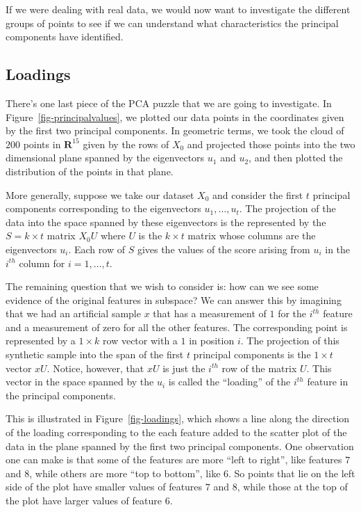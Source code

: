 \documentclass[
  11pt,
  letterpaper,
]{scrbook}
\theoremstyle{plain}
\theoremstyle{plain}
\theoremstyle{remark}
\begin{document}
If we were dealing with real data, we would now want to investigate the
different groups of points to see if we can understand what
characteristics the principal components have identified.

\hypertarget{loadings}{%
\subsection{Loadings}\label{loadings}}

There's one last piece of the PCA puzzle that we are going to
investigate. In Figure~\ref{fig-principalvalues}, we plotted our data
points in the coordinates given by the first two principal components.
In geometric terms, we took the cloud of \(200\) points in
\(\mathbf{R}^{15}\) given by the rows of \(X_{0}\) and projected those
points into the two dimensional plane spanned by the eigenvectors
\(u_{1}\) and \(u_{2}\), and then plotted the distribution of the points
in that plane.

More generally, suppose we take our dataset \(X_{0}\) and consider the
first \(t\) principal components corresponding to the eigenvectors
\(u_{1},\ldots, u_{t}\). The projection of the data into the space
spanned by these eigenvectors is the represented by the
\(S = k\times t\) matrix \(X_{0}U\) where \(U\) is the \(k\times t\)
matrix whose columns are the eigenvectors \(u_{i}\). Each row of \(S\)
gives the values of the score arising from \(u_{i}\) in the \(i^{th}\)
column for \(i=1,\ldots, t\).

The remaining question that we wish to consider is: how can we see some
evidence of the original features in subspace? We can answer this by
imagining that we had an artificial sample \(x\) that has a measurement
of \(1\) for the \(i^{th}\) feature and a measurement of zero for all
the other features. The corresponding point is represented by a
\(1\times k\) row vector with a \(1\) in position \(i\). The projection
of this synthetic sample into the span of the first \(t\) principal
components is the \(1\times t\) vector \(xU\). Notice, however, that
\(xU\) is just the \(i^{th}\) row of the matrix \(U\). This vector in
the space spanned by the \(u_{i}\) is called the ``loading'' of the
\(i^{th}\) feature in the principal components.

This is illustrated in Figure~\ref{fig-loadings}, which shows a line
along the direction of the loading corresponding to the each feature
added to the scatter plot of the data in the plane spanned by the first
two principal components. One observation one can make is that some of
the features are more ``left to right'', like features \(7\) and \(8\),
while others are more ``top to bottom'', like \(6\). So points that lie
on the left side of the plot have smaller values of features \(7\) and
\(8\), while those at the top of the plot have larger values of feature
\(6\).
\end{document}
